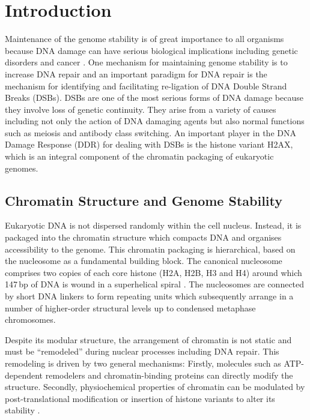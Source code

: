 \documentclass[graybox]{svmult}
\begin{document}
\newpage

\section{Introduction}

\label{sec:introduction}
Maintenance of the genome stability is of great importance to all organisms because DNA damage can
have serious biological implications including genetic disorders and cancer \cite{PJM07}. One
mechanism for maintaining genome stability is to increase DNA repair \cite{CLKWK98} and an important
paradigm for DNA repair is the mechanism for identifying and facilitating re-ligation of DNA Double
Strand Breaks (DSBs). DSBs are one of the most serious forms of DNA damage because they involve loss
of genetic continuity. They arise from a variety of causes including not only the action of DNA
damaging agents but also normal functions such as meiosis and antibody class switching. An important
player in the DNA Damage Response (DDR) for dealing with DSBs is the histone variant H2AX, which is
an integral component of the chromatin packaging of eukaryotic genomes.

\subsection{Chromatin Structure and Genome Stability}
\label{subsec:genome-stability}
Eukaryotic DNA is not dispersed randomly within the cell nucleus. Instead, it is packaged into the
chromatin structure which compacts DNA and organises accessibility to the genome. This chromatin
packaging is hierarchical, based on the nucleosome as a fundamental building block. The canonical
nucleosome comprises two copies of each core histone (H2A, H2B, H3 and H4) around which 147\,bp of
DNA is wound in a superhelical spiral \cite{CAD+02}. The nucleosomes are connected by short DNA
linkers to form repeating units which subsequently arrange in a number of higher-order structural
levels up to condensed metaphase chromosomes.

Despite its modular structure, the arrangement of chromatin is not static and must be ``remodeled''
during nuclear processes including DNA repair. This remodeling is driven by two general mechanisms:
Firstly, molecules such as ATP-dependent remodelers and chromatin-binding proteins can directly
modify the structure. Secondly, physiochemical properties of chromatin can be modulated by
post-translational modification or insertion of histone variants to alter its stability \cite{GFMG03,JA06}.
\end{document}

